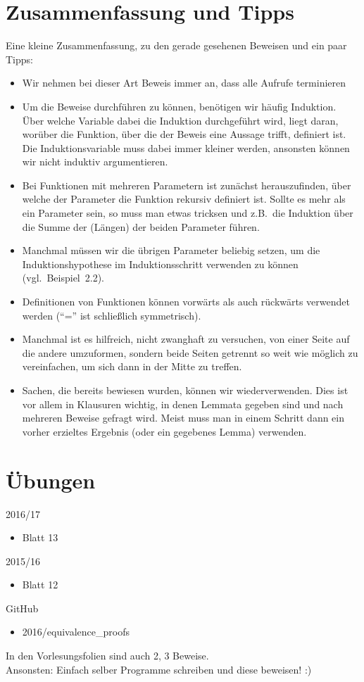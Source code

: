 \documentclass[hidelinks]{article}
\theoremstyle{plain}
\theoremstyle{definition}
\theoremstyle{rem}
\begin{document}
\begin{sloppypar}
\section{Zusammenfassung und Tipps}
Eine kleine Zusammenfassung, zu den gerade gesehenen Beweisen und ein paar Tipps:
\begin{itemize}
	\item Wir nehmen bei dieser Art Beweis immer an, dass alle Aufrufe terminieren
	\item Um die Beweise durchführen zu können, benötigen wir häufig Induktion. Über welche Variable dabei die Induktion durchgeführt wird, liegt daran, worüber die Funktion, über die der Beweis eine Aussage trifft, definiert ist.
	Die Induktionsvariable muss dabei immer kleiner werden, ansonsten können wir nicht induktiv argumentieren.
	\item Bei Funktionen mit mehreren Parametern ist zunächst herauszufinden, über welche der Parameter die Funktion rekursiv definiert ist. Sollte es mehr als ein Parameter sein, so muss man etwas tricksen und z.B.\ die Induktion über die Summe der (Längen) der beiden Parameter führen. 
	\item Manchmal müssen wir die übrigen Parameter beliebig setzen, um die Induktionshypothese im Induktionsschritt verwenden zu können (vgl.\ Beispiel~2.2).
	\item Definitionen von Funktionen können vorwärts als auch rückwärts verwendet werden (``='' ist schließlich symmetrisch).
	\item Manchmal ist es hilfreich, nicht zwanghaft zu versuchen, von einer Seite auf die andere umzuformen, sondern beide Seiten getrennt so weit wie möglich zu vereinfachen, um sich dann in der Mitte zu treffen.
	\item Sachen, die bereits bewiesen wurden, können wir wiederverwenden. Dies ist vor allem in Klausuren wichtig, in denen Lemmata gegeben sind und nach mehreren Beweise gefragt wird. Meist muss man in einem Schritt dann ein vorher erzieltes Ergebnis (oder ein gegebenes Lemma) verwenden.
\end{itemize}

\section{Übungen}
2016/17
\begin{itemize}
\item Blatt 13
\end{itemize}
2015/16
\begin{itemize}
\item Blatt 12
\end{itemize}
GitHub
\begin{itemize}
\item 2016/equivalence\_proofs
\end{itemize}
In den Vorlesungsfolien sind auch 2, 3 Beweise.\\
Ansonsten: Einfach selber Programme schreiben und diese beweisen! :)
\end{sloppypar}
\end{document}
